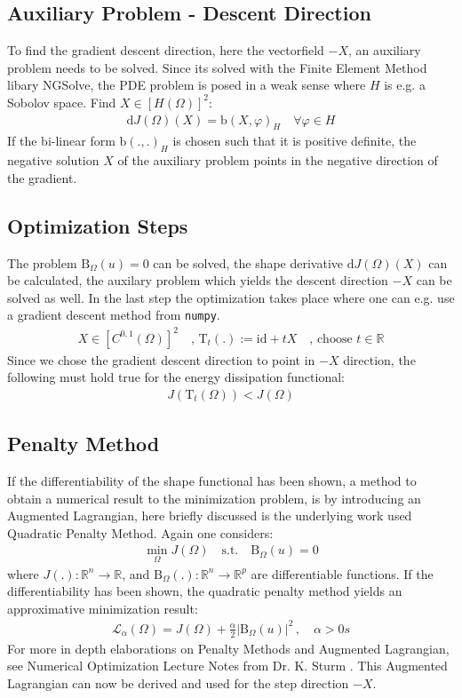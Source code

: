 \subsection*{Auxiliary Problem - Descent Direction}
To find the gradient descent direction, here the vectorfield $-X$, an auxiliary problem needs to be solved.
Since its solved with the Finite Element Method libary NGSolve, the PDE problem is posed in a weak sense where 
$H$ is e.g. a Sobolov space. Find $X \in [H(\Omega)]^2:$ 
\begin{align*}
    \mathrm{d}J(\Omega)(X) = \mathrm{b}(X,\varphi)_H \quad \forall  \varphi \in H
\end{align*}
If the bi-linear form $\mathrm{b}(.,.)_H$ is chosen such that it is positive definite, the negative solution $X$
of the auxiliary problem points in the negative direction of the gradient.

\pagebreak

\subsection*{Optimization Steps}
The problem $\mathrm{B}_{\Omega}(u) = 0$ can be solved, the shape derivative $\mathrm{d}J(\Omega)(X)$ can be calculated, the auxilary problem which yields 
the descent direction $-X$ can be solved as well. In the last step the optimization takes place where one can e.g. use a gradient descent method
 from \texttt{numpy}.
 \begin{align*}
    X \in [C^{0,1}(\Omega)]^2 \quad , \, \mathrm{T}_t(.):= \mathrm{id} + tX \quad , \, \text{choose } t \in \mathbb{R}
\end{align*}
Since we chose the gradient descent direction to point in $-X$ direction, the following must hold true for the energy dissipation functional:
\begin{align*}
    J(\mathrm{T}_t(\Omega)) <J(\Omega)
\end{align*}
\subsection*{Penalty Method}
If the differentiability of the shape functional has been shown, a method to obtain a numerical result to the minimization problem,
is by introducing an Augmented Lagrangian, here briefly discussed is the underlying work used Quadratic Penalty Method. Again one considers:
\begin{align*}
    \min_{ \Omega} J( \Omega) \quad \text{s.t.} \quad \mathrm{B}_{\Omega}(u) = 0
\end{align*}
where $J(.) : \mathbb{R}^n \rightarrow \mathbb{R}$, and $\mathrm{B}_{\Omega}(.):\mathbb{R}^n \rightarrow \mathbb{R}^p$ are differentiable functions.
If the differentiability has been shown, the quadratic penalty method yields an approximative minimization result:
\begin{align*}
    \mathcal{L}_{\alpha}(\Omega) = J(\Omega) + \frac{\alpha}{2}|\mathrm{B}_{\Omega}(u)|^2 \, , \quad \alpha > 0s
\end{align*}
For more in depth elaborations on Penalty Methods and Augmented Lagrangian, 
see Numerical Optimization Lecture Notes from Dr. K. Sturm \cite{lecture_notes_sturm}. This Augmented Lagrangian can now be derived 
and used for the step direction $-X$.